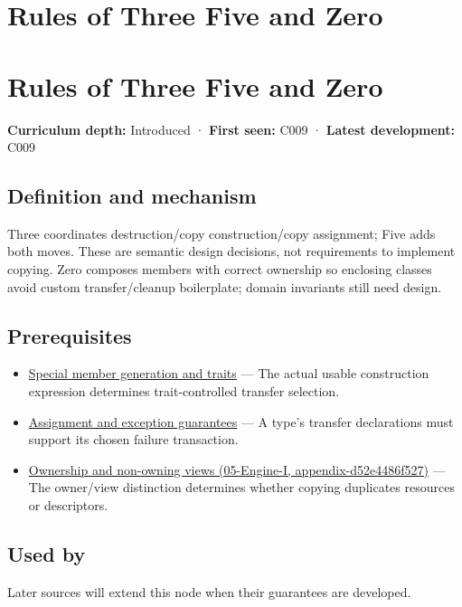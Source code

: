 \hypertarget{appendix-7679107d057e}{}
\section*{Rules of Three Five and Zero}
\section{Rules of Three Five and Zero}\label{rules-of-three-five-and-zero}

\textbf{Curriculum depth:} Introduced · \textbf{First seen:} C009 · \textbf{Latest development:} C009

\subsection{Definition and mechanism}\label{definition-and-mechanism}

Three coordinates destruction/copy construction/copy assignment; Five adds both moves. These are semantic design decisions, not requirements to implement copying. Zero composes members with correct ownership so enclosing classes avoid custom transfer/cleanup boilerplate; domain invariants still need design.

\subsection{Prerequisites}\label{prerequisites}

\begin{itemize}
\tightlist
\item
  \hyperref[appendix-42e02a12c694]{Special member generation and traits} --- The actual usable construction expression determines trait-controlled transfer selection.
\item
  \hyperref[appendix-bea6beb5350f]{Assignment and exception guarantees} --- A type's transfer declarations must support its chosen failure transaction.
\item
  \href{}{Ownership and non-owning views (05-Engine-I, appendix-d52e4486f527)} --- The owner/view distinction determines whether copying duplicates resources or descriptors.
\end{itemize}

\subsection{Used by}\label{used-by}

Later sources will extend this node when their guarantees are developed.

